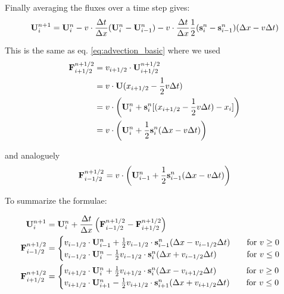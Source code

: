 Finally averaging the fluxes over a time step gives:
\begin{equation}
	\mathbf{U}_i^{n+1} = \mathbf{U}_i^n - v \cdot \frac{\Delta t}{\Delta x} ( \mathbf{U}_i ^n - \mathbf{U}_{i-1}^n) - v \cdot \frac{\Delta t}{\Delta x} \frac{1}{2} (\mathbf{s}_i^n - \mathbf{s}_{i-1}^n)(\Delta x - v \Delta t)
\end{equation}

This is the same as eq. \ref{eq:advection_basic} where we used
\begin{align*}
	\mathbf{F}_{i + 1/2}^{n+1/2} 
		& = v_{i+1/2} \cdot  \mathbf{U}_{i+1/2} ^{n + 1/2} \\
		& = v \cdot \mathbf{U}(x_{i+1/2} - \frac{1}{2} v \Delta t) \\
		& = v \cdot \left( \mathbf{U}_i^n + \mathbf{s}_i^n [(x_{i+1/2} - \frac{1}{2} v \Delta t) - x_i ]  \right)\\
		& = v \cdot \left( \mathbf{U}_i^n + \frac{1}{2} \mathbf{s}_i^n (\Delta x -  v \Delta t)  \right)\\
\end{align*}

and analoguely
\begin{align*}
	\mathbf{F}_{i - 1/2}^{n+1/2} 
		& = v \cdot \left( \mathbf{U}_{i-1}^n + \frac{1}{2} \mathbf{s}_{i-1}^n (\Delta x -  v \Delta t)  \right)\\
\end{align*}








To summarize the formulae:

\begin{align*}
	\mathbf{U}_i ^{n+1} &= 
		\mathbf{U}_i^{n} +  \frac{\Delta t}{\Delta x} \left( \mathbf{F}_{i-1/2}^{n+1/2} - \mathbf{F}_{i+1/2}^{n+1/2} \right) & \\
	\mathbf{F}_{i-1/2}^{n+1/2} &= 
		\begin{cases}
			v_{i-1/2} \cdot \mathbf{U}_{i-1}^n +  \frac{1}{2} v_{i-1/2} \cdot\mathbf{s}_{i-1}^n (\Delta x -  v_{i-1/2} \Delta t)
			 	& \quad \text{for } v \geq 0 \\
			v_{i-1/2} \cdot \mathbf{U}_{i}^n -\frac{1}{2} v_{i-1/2} \cdot \mathbf{s}_{i}^n (\Delta x + v_{i-1/2} \Delta t)
				& \quad \text{for } v \leq 0 \\
		\end{cases} \\
	\mathbf{F}_{i+1/2}^{n+1/2} &= 
		\begin{cases}
			v_{i+1/2} \cdot \mathbf{U}_{i}^n +  \frac{1}{2} v_{i+1/2} \cdot\mathbf{s}_{i}^n (\Delta x -  v_{i+1/2} \Delta t)
			 	& \quad \text{for } v \geq 0 \\
			v_{i+1/2} \cdot \mathbf{U}_{i+1}^n -\frac{1}{2} v_{i+1/2} \cdot \mathbf{s}_{i+1}^n (\Delta x + v_{i+1/2} \Delta t)
				& \quad \text{for } v \leq 0 \\
		\end{cases} \\		
\end{align*}





